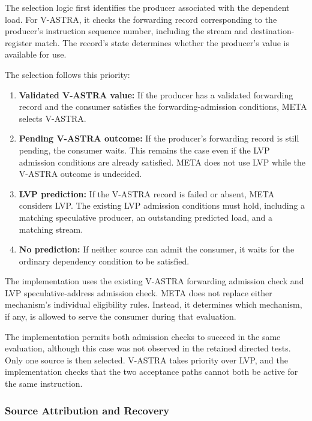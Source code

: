 The selection logic first identifies the producer associated
with the dependent load. For V-ASTRA, it checks the forwarding
record corresponding to the producer's instruction sequence
number, including the stream and destination-register match.
The record's state determines whether the producer's value is
available for use.

The selection follows this priority:

\begin{enumerate}
    \item \textbf{Validated V-ASTRA value:} If the producer has
    a validated forwarding record and the consumer satisfies
    the forwarding-admission conditions, META selects V-ASTRA.

    \item \textbf{Pending V-ASTRA outcome:} If the producer's
    forwarding record is still pending, the consumer waits.
    This remains the case even if the LVP admission conditions
    are already satisfied. META does not use LVP while the
    V-ASTRA outcome is undecided.

    \item \textbf{LVP prediction:} If the V-ASTRA record is
    failed or absent, META considers LVP. The existing LVP
    admission conditions must hold, including a matching
    speculative producer, an outstanding predicted load, and
    a matching stream.

    \item \textbf{No prediction:} If neither source can admit
    the consumer, it waits for the ordinary dependency
    condition to be satisfied.
\end{enumerate}

The implementation uses the existing V-ASTRA forwarding
admission check and LVP speculative-address admission check.
META does not replace either mechanism's individual eligibility
rules. Instead, it determines which mechanism, if any, is
allowed to serve the consumer during that evaluation.

The implementation permits both admission checks to succeed in the
same evaluation, although this case was not observed in the retained
directed tests. Only one source is then selected. V-ASTRA takes
priority over LVP, and the implementation checks that the two acceptance paths
cannot both be active for the same instruction.

\subsubsection{Source Attribution and Recovery}


